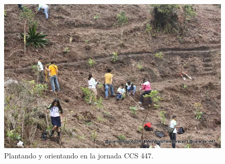 \begin{itemize}
\begin{figure}[H]
    \centering
    \includegraphics[scale=0.5]{imagenes/foto10}
    \caption{Plantando y orientando en la jornada CCS 447.}
    \label{foto10}
\end{figure}

\end{itemize}